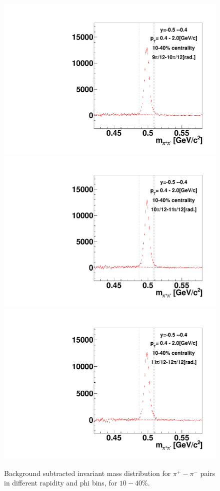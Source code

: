 \begin{figure}[h]
\includegraphics[width=0.14\linewidth]{chapterX/fig/ks_v1_sig/kf_ptslice0_cent1_ks_flow_phi10_rap9.pdf}
\includegraphics[width=0.14\linewidth]{chapterX/fig/ks_v1_sig/kf_ptslice0_cent1_ks_flow_phi11_rap9.pdf}
\includegraphics[width=0.14\linewidth]{chapterX/fig/ks_v1_sig/kf_ptslice0_cent1_ks_flow_phi12_rap9.pdf}

\caption{Background subtracted invariant mass distribution for $\pi^{+}-\pi^{-}$ pairs in different rapidity and phi bins, for $10-40\%$.}
\label{ks_v1_sig2}
\end{figure}

